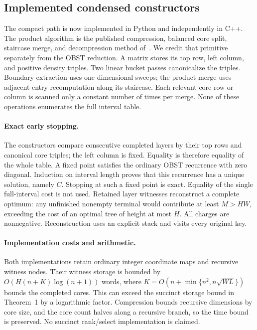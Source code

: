 \documentclass[11pt]{article}
\begin{document}
\subsection{Implemented condensed constructors}\label{sec:legacy-19-5}
The compact path is now implemented in Python and independently in C++.
The product algorithm is the published compression, balanced core split,
staircase merge, and decompression method of~\cite{coremonge}. We credit
that primitive separately from the OBST reduction. A matrix stores its top
row, left column, and positive density triples. Two linear bucket passes
canonicalize the triples. Boundary extraction uses one-dimensional sweeps;
the product merge uses adjacent-entry recomputation along its staircase.
Each relevant core row or column is scanned only a constant number of times
per merge. None of these operations enumerates the full interval table.

\paragraph{Exact early stopping.}
The constructors compare consecutive completed layers by their top rows
and canonical core triples; the left column is fixed. Equality is therefore
equality of the whole table. A fixed point satisfies the ordinary OBST
recurrence with zero diagonal. Induction on interval length proves that
this recurrence has a unique solution, namely $C$. Stopping at such a fixed
point is exact. Equality of the single full-interval cost is not used.
Retained layer witnesses reconstruct a complete optimum: any unfinished
nonempty terminal would contribute at least $M>HW$, exceeding the
cost of an optimal tree of height at most $H$. All charges are nonnegative.
Reconstruction uses an explicit stack and visits every original key.

\paragraph{Implementation costs and arithmetic.}
Both implementations retain ordinary integer coordinate maps and recursive
witness nodes. Their witness storage is bounded by
$O(H(n+K)\log(n+1))$ words, where
$K=O(n+\min\{n^2,n\sqrt{WL}\})$ bounds the completed cores. This can
exceed the succinct storage bound in Theorem~1
by a logarithmic factor. Compression bounds recursive dimensions by core
size, and the core count halves along a recursive branch, so the time bound
is preserved. No succinct rank/select implementation is claimed.
\end{document}
